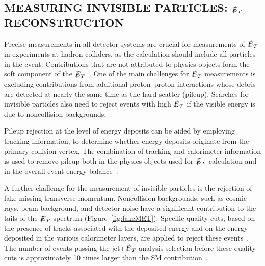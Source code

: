 \documentclass{ar-1col}
\newcommand{\MET}{\ensuremath{\slashed{E}_T}\xspace}
\begin{document}
\begin{textbox}
\section{MEASURING INVISIBLE PARTICLES: \MET RECONSTRUCTION}

\noindent Precise measurements in all detector systems are crucial
for measurements of \MET in experiments at hadron colliders, as the
calculation should include all particles in the event.
Contributions that are not attributed to physics objects form the
soft component of the \MET~\cite{Aad:2016nrq,CMS-PAS-JME-16-004}.
One of the main challenges for \MET measurements is excluding
contributions from additional proton--proton interactions whose
debris are detected at nearly the same time as the hard scatter
(pileup). Searches for invisible particles also need to reject
events with high \MET if the visible energy is due to
noncollision backgrounds.

Pileup rejection at the level of energy deposits can be aided by employing tracking information, 
to determine whether energy deposits
originate from the primary collision vertex. The combination of tracking and calorimeter
information is used to remove pileup both in the physics
objects used for \MET calculation and in the overall event energy
balance~\cite{CMS-PAS-JME-16-004,ATLAS-CONF-2014-019}.

A further challenge for the measurement of invisible particles is the rejection of fake missing transverse momentum. Noncollision backgrounds, such as cosmic rays, beam background, and detector
noise have a significant contribution to the tails of the \MET
spectrum (Figure~\ref{fig:fakeMET}). Specific quality
cuts, based on the presence of tracks associated with the deposited
energy and on the energy deposited in the various calorimeter layers,
are applied to reject these events~\cite{ATLAS-CONF-2015-029}. The
number of events passing the jet+\MET analysis selection before
these quality cuts is approximately 10 times larger than the SM
contribution~\cite{Aaboud:2016tnv}.
\end{textbox}
\end{document}
